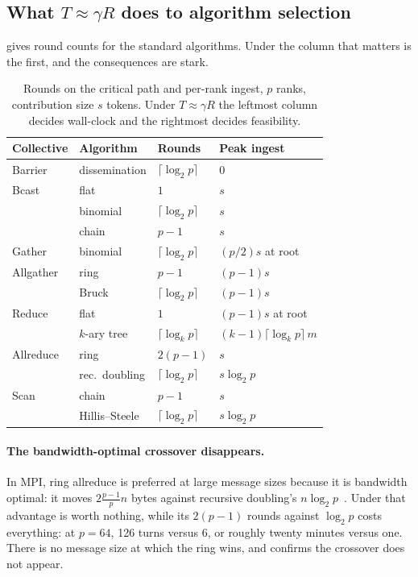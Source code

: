 \subsection{What \texorpdfstring{$T \approx \gamma R$}{T = gamma R} does to
algorithm selection}

 gives round counts for the standard algorithms.
Under  the column that matters is the first, and the
consequences are stark.

\begin{table}[t]
\centering
\footnotesize
\caption{Rounds on the critical path and per-rank ingest, $p$ ranks,
contribution size $s$ tokens. Under $T \approx \gamma R$ the leftmost
column decides wall-clock and the rightmost decides feasibility.}
\label{tab:rounds}
\begin{tabular}{@{}llll@{}}
\toprule
\textbf{Collective} & \textbf{Algorithm} & \textbf{Rounds} & \textbf{Peak ingest}\\
\midrule
Barrier & dissemination & $\lceil\log_2 p\rceil$ & $0$\\
\midrule
Bcast & flat & $1$ & $s$\\
      & binomial & $\lceil\log_2 p\rceil$ & $s$\\
      & chain & $p-1$ & $s$\\
\midrule
Gather & binomial & $\lceil\log_2 p\rceil$ & $(p/2)s$ at root\\
\midrule
Allgather & ring & $p-1$ & $(p-1)s$\\
          & Bruck & $\lceil\log_2 p\rceil$ & $(p-1)s$\\
\midrule
Reduce & flat & $1$ & $(p-1)s$ at root\\
       & $k$-ary tree & $\lceil\log_k p\rceil$ & $(k-1)\lceil\log_k p\rceil\,m$\\
\midrule
Allreduce & ring & $2(p-1)$ & $s$\\
          & rec.\ doubling & $\lceil\log_2 p\rceil$ & $s\log_2 p$\\
\midrule
Scan & chain & $p-1$ & $s$\\
     & Hillis--Steele & $\lceil\log_2 p\rceil$ & $s\log_2 p$\\
\midrule
\bottomrule
\end{tabular}
\end{table}

\paragraph{The bandwidth-optimal crossover disappears.}
In MPI, ring allreduce is preferred at large message sizes because it is
bandwidth optimal: it moves $2\frac{p-1}{p}n$ bytes against recursive
doubling's $n\log_2 p$~\cite{Rabenseifner2004,Patarasuk2009}.
Under  that advantage is worth nothing, while its
$2(p-1)$ rounds against $\log_2 p$ costs everything: at $p=64$, 126 turns
versus 6, or roughly twenty minutes versus one. There is no message size at
which the ring wins, and  confirms the crossover does
not appear.

